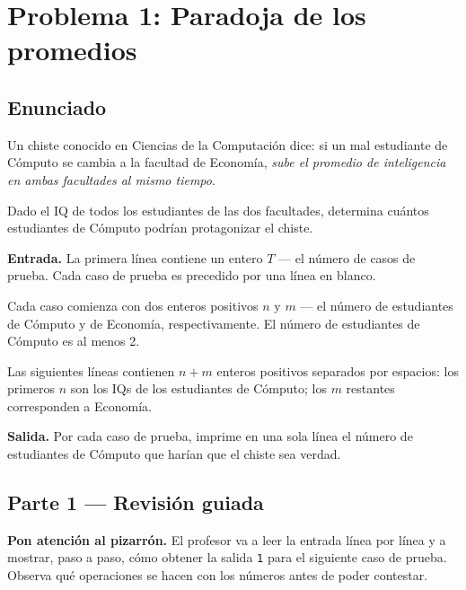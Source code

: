 \documentclass[12pt, oneside]{article}
\begin{document}
\section{Problema 1: Paradoja de los promedios}

\subsection{Enunciado}

Un chiste conocido en Ciencias de la Computación dice: si un mal estudiante de
Cómputo se cambia a la facultad de Economía, \textit{sube el promedio de
inteligencia en ambas facultades al mismo tiempo}.

Dado el IQ de todos los estudiantes de las dos facultades, determina cuántos
estudiantes de Cómputo podrían protagonizar el chiste.

\textbf{Entrada.}
La primera línea contiene un entero $T$ — el número de casos de prueba.
Cada caso de prueba es precedido por una línea en blanco.

Cada caso comienza con dos enteros positivos $n$ y $m$ — el número de
estudiantes de Cómputo y de Economía, respectivamente.
El número de estudiantes de Cómputo es al menos 2.

Las siguientes líneas contienen $n + m$ enteros positivos separados por
espacios: los primeros $n$ son los IQs de los estudiantes de Cómputo;
los $m$ restantes corresponden a Economía.

\textbf{Salida.}
Por cada caso de prueba, imprime en una sola línea el número de estudiantes
de Cómputo que harían que el chiste sea verdad.

\subsection{Parte 1 — Revisión guiada}

\begin{advertencia}
  \textbf{Pon atención al pizarrón.}  El profesor va a leer la entrada
  línea por línea y a mostrar, paso a paso, cómo obtener la salida
  \texttt{1} para el siguiente caso de prueba.  Observa qué operaciones
  se hacen con los números antes de poder contestar.
\end{advertencia}
\end{document}
